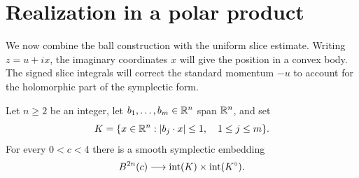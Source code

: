 \section{Realization in a polar product}
\label{sec:realization}

We now combine the ball construction with the uniform slice estimate.
Writing \(z=u+ix\), the imaginary coordinates \(x\) will give the position
in a convex body.  The signed slice integrals will correct the standard
momentum \(-u\) to account for the holomorphic part of the symplectic form.

\begin{proposition}\label{prop:finite-strips}
Let $n\ge2$ be an integer, let $b_1,\ldots,b_m\in\mathbb R^n$ span $\mathbb R^n$,
and set
\[
 K=\{x\in\mathbb R^n: |b_j\cdot x|\le 1,
                         \quad 1\le j\le m\}.
\]
For every $0<c<4$ there is a smooth symplectic embedding
\[
 B^{2n}(c)\longrightarrow
 \operatorname{int}(K)\times\operatorname{int}(K^\circ).
\]
\end{proposition}

